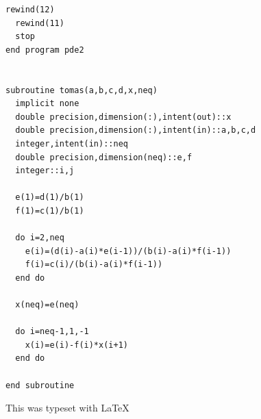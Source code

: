 \documentclass[titlepage,11pt]{article}
\begin{document}
\begin{singlespacing}
\begin{small}
\begin{Verbatim}[frame=single]
  rewind(12)
  rewind(11)
  stop
end program pde2


subroutine tomas(a,b,c,d,x,neq)
  implicit none
  double precision,dimension(:),intent(out)::x
  double precision,dimension(:),intent(in)::a,b,c,d
  integer,intent(in)::neq
  double precision,dimension(neq)::e,f
  integer::i,j

  e(1)=d(1)/b(1)
  f(1)=c(1)/b(1)

  do i=2,neq
    e(i)=(d(i)-a(i)*e(i-1))/(b(i)-a(i)*f(i-1))
    f(i)=c(i)/(b(i)-a(i)*f(i-1))
  end do

  x(neq)=e(neq)

  do i=neq-1,1,-1
    x(i)=e(i)-f(i)*x(i+1)
  end do

end subroutine

\end{Verbatim}
\end{small}
\end{singlespacing}
\noindent This was typeset with \LaTeX
\end{document}
